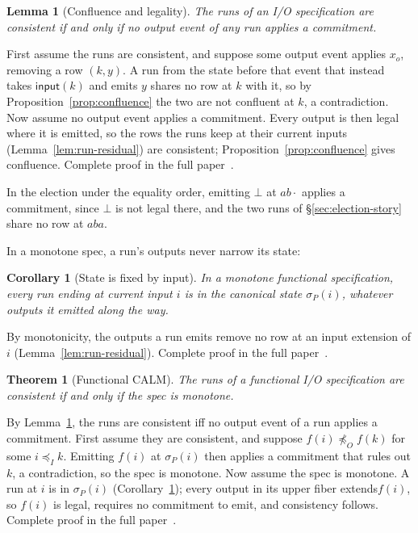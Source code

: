 \documentclass[sigconf]{cidr-2027}
\makeatletter
\newtheorem{theorem}{Theorem}
\newtheorem{lemma}{Lemma}
\newtheorem{corollary}{Corollary}
\theoremstyle{remark}
\newcommand{\InputOrd}{\preceq_I}
\newcommand{\OutputOrd}{\preceq_O}
\newcommand{\commitment}{commitment\xspace}
\newcommand{\outrel}{extends\xspace}          %
\newcommand{\spectype}[1][]{I/O specification#1\xspace}
\newcommand{\fullproof}{Complete proof in the full paper~\cite{hellerstein2026completecalmfull}.}
\renewenvironment{proof}[1][\proofname]{\par
  \pushQED{\qed}\normalfont\topsep2\p@\relax
  \trivlist\item[\@proofindent\hskip\labelsep{\@proofnamefont #1\@addpunct{.}}]\ignorespaces
}{\popQED\endtrivlist\@endpefalse}
\makeatother
\begin{document}
\begin{lemma}[Confluence and legality]
\label{lem:confluence-legality}
The runs of an \spectype are consistent if and only if no output event of any
run applies a \commitment.
\end{lemma}

\begin{proof}[Proof sketch]
First assume the runs are consistent, and suppose some output event applies
$x_o$, removing a row $(k,y)$.  A run from the state before that event that
instead takes $\mathsf{input}(k)$ and emits $y$ shares no row at $k$ with it,
so by Proposition~\ref{prop:confluence} the two are not confluent at $k$, a
contradiction.  Now assume no output event applies a \commitment.  Every output
is then legal where it is emitted, so the rows the runs keep at their current
inputs (Lemma~\ref{lem:run-residual}) are consistent;
Proposition~\ref{prop:confluence} gives confluence.
\fullproof
\end{proof}

In the election under the equality order, emitting $\bot$ at $ab\cdot$ applies
a \commitment, since $\bot$ is not legal there, and the two runs of
\S\ref{sec:election-story} share no row at $aba$.

In a monotone spec, a run's outputs never narrow its state:

\begin{corollary}[State is fixed by input]
\label{cor:state-by-input}
In a monotone functional specification, every run ending at current
input $i$ is in the canonical state $\sigma_P(i)$, whatever outputs it emitted
along the way.
\end{corollary}
\begin{proof}[Proof sketch]
By monotonicity, the outputs a run emits remove no row at an input extension of
$i$ (Lemma~\ref{lem:run-residual}).
\fullproof
\end{proof}

\begin{theorem}[Functional CALM]
\label{thm:functional-calm}
The runs of a functional \spectype are consistent if and only if the spec is
monotone.
\end{theorem}

\begin{proof}[Proof sketch]
By Lemma~\ref{lem:confluence-legality}, the runs are consistent iff
no output event of a run applies a \commitment.  First assume they are
consistent, and suppose $f(i)\not\OutputOrd f(k)$ for some $i\InputOrd k$.
Emitting $f(i)$ at $\sigma_P(i)$ then applies a \commitment that rules out $k$,
a contradiction, so the spec is monotone.  Now assume the spec is monotone.  A
run at $i$ is in $\sigma_P(i)$ (Corollary~\ref{cor:state-by-input}); every
output in its upper fiber \outrel $f(i)$, so $f(i)$ is legal, requires no \commitment
to emit, and consistency follows.  \fullproof
\end{proof}
\end{document}
